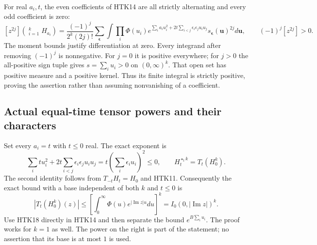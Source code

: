For real $a_i,t$, the even coefficients of HTK14 are all
strictly alternating and every odd coefficient is zero:
\begin{equation}\tag{HTK17}
 [z^{2j}]\left(\mathop{\star_t}_{i=1}^kH_{a_i}\right)
 =\frac{(-1)^j}{2^k(2j)!}
   \sum_{\boldsymbol\epsilon}\int
      \prod_i\Phi(u_i)e^{\sum_i a_i u_i^2+
                      2t\sum_{i<j}\epsilon_i\epsilon_j u_i u_j}
                 s_{\boldsymbol\epsilon}(\mathbf u)^{2j}d\mathbf u,
 \qquad (-1)^j[z^{2j}]>0.
\end{equation}
The moment bounds justify differentiation at zero.
Every integrand after removing $(-1)^j$ is nonnegative.
For $j=0$ it is positive everywhere; for $j>0$ the all-positive
sign tuple gives $s=\sum_i u_i>0$ on $(0,\infty)^k$.
That open set has positive measure and a positive kernel.
Thus its finite integral is strictly positive, proving the
assertion rather than assuming nonvanishing of a coefficient.

\subsection{Actual equal-time tensor powers and their characters}

Set every $a_i=t$ with $t\le0$ real. The exact exponent is
\begin{equation}\tag{HTK18}
 \sum_i t u_i^2+2t\sum_{i<j}\epsilon_i\epsilon_j u_iu_j
            =t\left(\sum_i\epsilon_i u_i\right)^2\le0,
 \qquad
 H_t^{\star_t k}=T_t(H_0^k).
\end{equation}
The second identity follows from $T_{-t}H_t=H_0$ and
HTK11. Consequently the exact bound with a base independent
of both $k$ and $t\le0$ is
\begin{equation}\tag{HTK19}
 \boxed{\displaystyle
 |T_t(H_0^k)(z)|\le
       \left[\int_0^\infty\Phi(u)e^{|\operatorname{Im}z|u}du\right]^k
       = I_0(0,|\operatorname{Im}z|)^k.}
\end{equation}
Use HTK18 directly in HTK14 and then separate the bound
$e^{B\sum_i u_i}$. The proof works for $k=1$ as well.
The power on the right is part of the statement; no assertion
that its base is at most $1$ is used.

